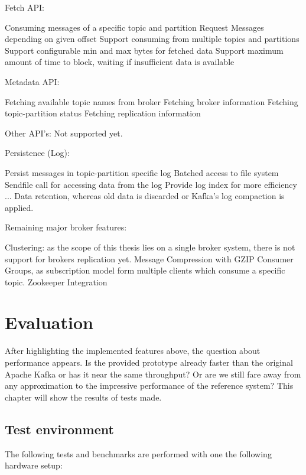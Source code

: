 Fetch API: 
\begin{itemize}
        \tick Consuming messages of a specific topic and partition
        \tick Request Messages depending on given offset
        \fail Support consuming from multiple topics and partitions 
        \fail Support configurable min and max bytes for fetched data
        \fail Support maximum amount of time to block, waiting if insufficient
        data is available
\end{itemize}

Metadata API: 
\begin{itemize}
        \tick Fetching available topic names from broker 
        \fail Fetching broker information
        \fail Fetching topic-partition status
        \fail Fetching replication information
\end{itemize}

Other API's:
Not supported yet.

Persistence (Log): 
\begin{itemize}
        \tick Persist messages in topic-partition specific log
        \tick Batched access to file system
        \tick Sendfile call for accessing data from the log
        \tick Provide log index for more efficiency
        \fail ...
        \fail Data retention, whereas old data is discarded or Kafka's log compaction is applied. 
\end{itemize}

Remaining major broker features: 
\begin{itemize}
        \fail Clustering: as the scope of this thesis lies on a single broker
        system, there is not support for brokers replication yet.
        \fail Message Compression with GZIP
        \fail Consumer Groups, as subscription model form multiple clients which consume a specific topic.
        \fail Zookeeper Integration 
\end{itemize}

\newpage
\section{Evaluation}
After highlighting the implemented features above, the question about
performance appears. Is the provided prototype already faster than the original
Apache Kafka or has it near the same throughput? Or are we still fare away from any
approximation to the impressive performance of the reference system? This
chapter will show the results of tests made.

\subsection{Test environment}
The following tests and benchmarks are performed with one the following
hardware setup:

